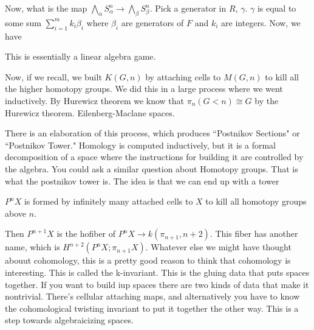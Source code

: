 \documentclass[12pt]{article}
\theoremstyle{definition}
\begin{document}
	Now, what is the map $\bigwedge_\alpha S_\alpha^n\to \bigwedge_\beta S_\beta^n$. Pick a generator in $R$, $\gamma$. $\gamma$ is equal to some sum $\sum_{i=1}^m k_i\beta_i$ where $\beta_i$ are generators of $F$ and $k_i$ are integers. Now, we have \begin{center}
	\end{center}
	
	This is essentially a linear algebra game.
	
	Now, if we recall, we built $K(G,n)$ by attaching cells to $M(G,n)$ to kill all the higher homotopy groups. We did this in a large process where we went inductively. By Hurewicz theorem we know that $\pi_n(G<n)\cong G$ by the Hurewicz theorem. Eilenberg-Maclane spaces. 
	
	There is an elaboration of this process, which produces ``Postnikov Sections" or ``Postnikov Tower." Homology is computed inductively, but it is a formal decomposition of a space where the instructions for building it are controlled by the algebra. You could ask a similar question about Homotopy groups. That is what the postnikov tower is. The idea is that we can end up with a tower \begin{center}
	\end{center}
	$P^nX$ is formed by infinitely many attached cells to $X$ to kill all homotopy groups above $n$. 
	\begin{center}
	\end{center}
	Then $P^{n+1} X$ is the hofiber of $P^nX\to k(\pi_{n+1}, n+2)$. This fiber has another name, which is $H^{n+2}(P^n X; \pi_{n+1}X)$. Whatever else we might have thought abouut cohomology, this is a pretty good reason to think that cohomology is interesting. This is called the k-invariant. This is the gluing data that puts spaces together. If you want to build iup spaces there are two kinds of data that make it nontrivial. There's cellular attaching maps, and alternatively you have to know the cohomological twisting invariant to put it together the other way. This is a step towards algebraicizing spaces. 
	
\end{document}
